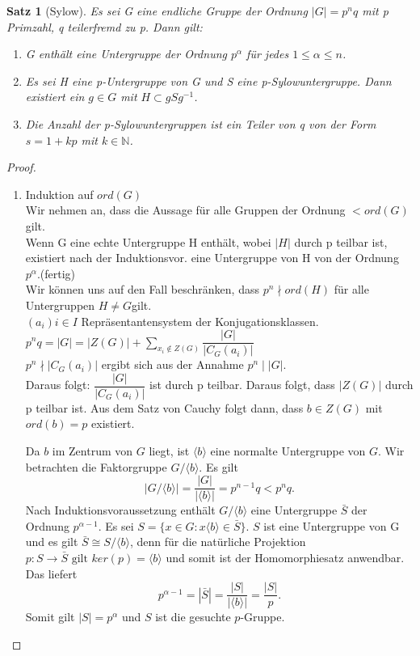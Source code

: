 \documentclass[12pt]{scrartcl}%
\newtheorem{thm}{Satz}
\theoremstyle{definition}
\theoremstyle{remark}
\begin{document}
\begin{thm} [Sylow]
Es sei G eine endliche Gruppe der Ordnung $|G|=p^n q$ mit p Primzahl, q teilerfremd zu p. Dann gilt:

\begin{enumerate}
\item G enthält eine Untergruppe der Ordnung $p^\alpha$ für jedes $1\leq \alpha \leq n$.
\item Es sei H eine p-Untergruppe von G und S eine p-Sylowuntergruppe. Dann existiert ein $g \in G$ mit $H \subset gSg^{-1}$.
\item Die Anzahl der p-Sylowuntergruppen ist ein Teiler von q von der Form $s=1+kp$ mit $k \in \mathbb{N}$.
\end{enumerate}
\end{thm}

\begin{proof}
\begin{enumerate}
\item Induktion auf $ord(G)$ \\
Wir nehmen an, dass die Aussage für alle Gruppen der Ordnung $< ord(G)$ gilt. \\
Wenn G eine echte Untergruppe H enthält, wobei $|H|$ durch p teilbar ist, existiert nach der Induktionsvor. eine Untergruppe von H von der Ordnung $p^\alpha$.(fertig) \\
Wir können uns auf den Fall beschränken, dass $p^n \nmid ord(H)$ für alle Untergruppen $H\neq G$gilt. \\
$(a_{i}){i \in I}$ Repräsentantensystem der Konjugationsklassen. \\
$p^n q=|G|=|Z(G)|+\sum_{x_{i}\notin Z(G)}\dfrac{|G|}{|C_{G}(a_{i})|}$ \\
$p^n \nmid |C_{G}(a_{i})|$ ergibt sich aus der Annahme $p^n \mid |G|$. \\
Daraus folgt: $\dfrac{|G|}{|C_{G}(a_{i})|}$ ist durch p teilbar. Daraus folgt, dass $|Z(G)|$ durch p teilbar ist. Aus dem Satz von Cauchy folgt dann, dass $b \in Z(G)$ mit $ord(b)=p$ existiert.

Da $b$ im Zentrum von $G$ liegt, ist $\langle b \rangle$ eine normalte Untergruppe von $G$. Wir betrachten die Faktorgruppe $G/ \langle b \rangle$. Es gilt
	$$ |G/ \langle b \rangle | = \frac{|G|}{| \langle b \rangle |} = p^{n-1}q < p^nq. $$
	Nach Induktionsvoraussetzung enthält $G / \langle b \rangle$ eine Untergruppe $\bar{S}$ der Ordnung $p^{\alpha - 1}$. Es sei $S = \{ x \in G : x \langle b \rangle \in \bar{S} \}$. $S$ ist eine Untergruppe von G und es gilt $ \bar{S} \cong S/ \langle b \rangle$, denn für die natürliche Projektion $p: S \rightarrow \bar{S} \text{ gilt } ker(p) = \langle b \rangle$ und somit ist der Homomorphiesatz anwendbar. Das liefert
	$$ p^{\alpha - 1} = |\bar{S}| = \frac{|S|}{| \langle b \rangle |} = \frac{|S|}{p}. $$
	Somit gilt $|S| = p^{\alpha}$ und $S$ ist die gesuchte $p$-Gruppe.
	

\end{enumerate}
\end{proof}
\end{document}
